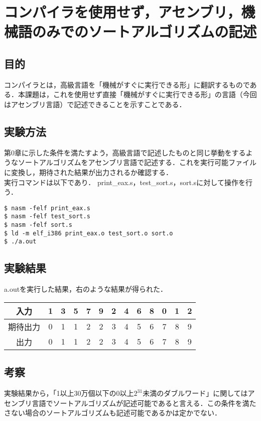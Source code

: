 \chapter{コンパイラを使用せず，アセンブリ，機械語のみでのソートアルゴリズムの記述}
\vspace{-1cm}
\section{目的}
コンパイラとは，高級言語を「機械がすぐに実行できる形」に翻訳するものである．本課題は，これを使用せず直接「機械がすぐに実行できる形」の言語（今回はアセンブリ言語）で記述できることを示すことである．

\section{実験方法}
第0章に示した条件を満たすよう，高級言語で記述したものと同じ挙動をするようなソートアルゴリズムをアセンブリ言語で記述する．これを実行可能ファイルに変換し，期待された結果が出力されるか確認する．\\
実行コマンドは以下であり．
print\_eax.s，test\_sort.s，sort.sに対して操作を行う．
\begin{lstlisting}[numbers={none}, caption={実行コマンド}, label={fig:実行コマンド}]
$ nasm -felf print_eax.s
$ nasm -felf test_sort.s
$ nasm -felf sort.s
$ ld -m elf_i386 print_eax.o test_sort.o sort.o
$ ./a.out
\end{lstlisting}

\section{実験結果}
\begin{table}[h]
  \centering
   \begin{minipage}{0.45\textwidth}
     a.outを実行した結果，右のような結果が得られた．\\
   \end{minipage}
   \hfill
   \begin{minipage}{0.45\textwidth}
     \centering
     \begin{tabular}{c|cccccccccccc}
       入力 & 1 & 3 & 5 & 7 & 9 & 2 & 4 & 6 & 8 & 0 & 1 & 2\\\hline
       期待出力 & 0 & 1 & 1 & 2 & 2 & 3 & 4 & 5 & 6 & 7 & 8 & 9\\
       出力 & 0 & 1 & 1 & 2 & 2 & 3 & 4 & 5 & 6 & 7 & 8 & 9\\
     \end{tabular}
   \end{minipage}
\end{table}

\section{考察}
実験結果から，「1以上30万個以下の0以上$2^{31}$未満のダブルワード」に関してはアセンブリ言語でソートアルゴリズムが記述可能であると言える．この条件を満たさない場合のソートアルゴリズムも記述可能であるかは定かでない．
